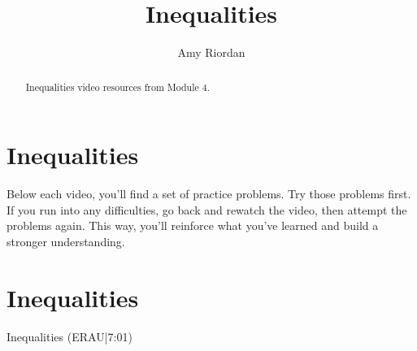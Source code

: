 \documentclass{ximera}
\title{Inequalities}
\author{Amy Riordan}
\begin{document}
\begin{abstract}
Inequalities video resources from Module 4.
\end{abstract}
\maketitle

\section*{Inequalities}

Below each video, you’ll find a set of practice problems. Try those problems first. If you run into any difficulties, go back and rewatch the video, then attempt the problems again. This way, you’ll reinforce what you’ve learned and build a stronger understanding.

\section*{Inequalities}

Inequalities (ERAU|7:01)

\end{document}
